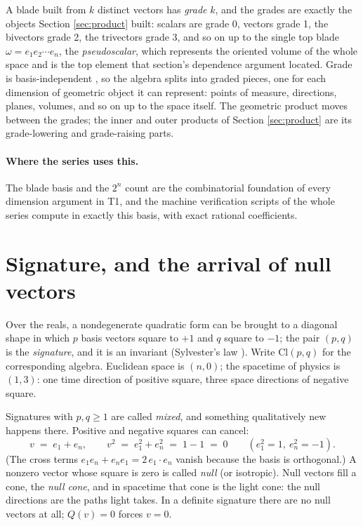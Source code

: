 \documentclass[11pt]{article}
\theoremstyle{plain}
\theoremstyle{definition}
\newcommand{\Cl}{\mathrm{Cl}}
\begin{document}
A blade built from $k$ distinct vectors has \emph{grade} $k$, and the grades are exactly the objects Section \ref{sec:product} built: scalars are grade 0, vectors grade 1, the bivectors grade 2, the trivectors grade 3, and so on up to the single top blade $\omega = e_1 e_2 \cdots e_n$, the \emph{pseudoscalar}, which represents the oriented volume of the whole space and is the top element that section's dependence argument located. Grade is basis-independent \cite{Porteous1995}, so the algebra splits into graded pieces, one for each dimension of geometric object it can represent: points of measure, directions, planes, volumes, and so on up to the space itself. The geometric product moves between the grades; the inner and outer products of Section \ref{sec:product} are its grade-lowering and grade-raising parts.

\paragraph{Where the series uses this.} The blade basis and the $2^{n}$ count are the combinatorial foundation of every dimension argument in T1, and the machine verification scripts of the whole series compute in exactly this basis, with exact rational coefficients.

\section{Signature, and the arrival of null vectors}\label{sec:signature}

Over the reals, a nondegenerate quadratic form can be brought to a diagonal shape in which $p$ basis vectors square to $+1$ and $q$ square to $-1$; the pair $(p,q)$ is the \emph{signature}, and it is an invariant (Sylvester's law \cite{Lam2005}). Write $\Cl(p,q)$ for the corresponding algebra. Euclidean space is $(n, 0)$; the spacetime of physics is $(1,3)$: one time direction of positive square, three space directions of negative square.

Signatures with $p, q \geq 1$ are called \emph{mixed}, and something qualitatively new happens there. Positive and negative squares can cancel:
\[
v \;=\; e_1 + e_n, \qquad v^{2} \;=\; e_1^{2} + e_n^{2} \;=\; 1 - 1 \;=\; 0 \qquad (e_1^2 = 1,\ e_n^2 = -1).
\]
(The cross terms $e_1 e_n + e_n e_1 = 2\,e_1 \cdot e_n$ vanish because the basis is orthogonal.) A nonzero vector whose square is zero is called \emph{null} (or isotropic). Null vectors fill a cone, the \emph{null cone}, and in spacetime that cone is the light cone: the null directions are the paths light takes. In a definite signature there are no null vectors at all; $Q(v) = 0$ forces $v = 0$.
\end{document}

